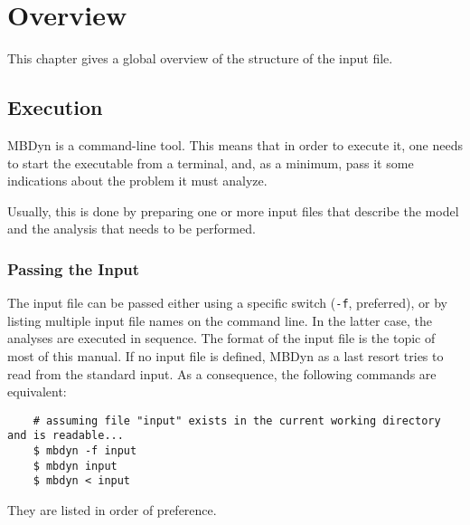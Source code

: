 %
%
%
%
%
% 
%
%

\chapter{Overview}\label{sec:OVERVIEW}
This chapter gives a global overview of the structure of the input file.


\section{Execution}
MBDyn is a command-line tool.
This means that in order to execute it, one needs to start the executable
from a terminal, and, as a minimum, pass it some indications about the problem
it must analyze.

Usually, this is done by preparing one or more input files that describe
the model and the analysis that needs to be performed.

\subsection{Passing the Input}
The input file can be passed either using a specific switch
(\texttt{-f}, preferred),
or by listing multiple input file names on the command line.
In the latter case, the analyses are executed in sequence.
The format of the input file is the topic of most of this manual.
If no input file is defined, MBDyn as a last resort tries to read
from the standard input.
As a consequence, the following commands are equivalent:
\begin{verbatim}
    # assuming file "input" exists in the current working directory and is readable...
    $ mbdyn -f input
    $ mbdyn input
    $ mbdyn < input
\end{verbatim}
They are listed in order of preference.

